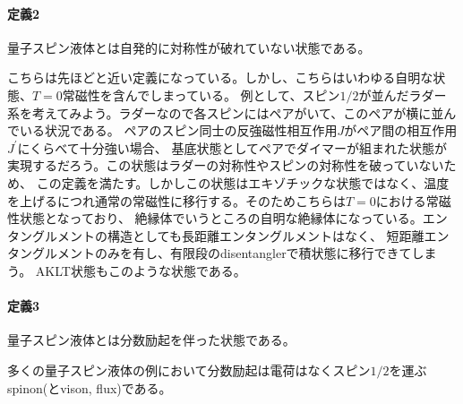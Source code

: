 \documentclass[11pt, aps, longbibliography]{article}
\begin{document}
        \begin{tcolorbox}\hypertarget{def2}{}
            \paragraph{定義2}
            量子スピン液体とは自発的に対称性が破れていない状態である。
        \end{tcolorbox}
        こちらは先ほどと近い定義になっている。しかし、こちらはいわゆる自明な状態、$T=0$常磁性を含んでしまっている。
        例として、スピン$1/2$が並んだラダー系を考えてみよう。ラダーなので各スピンにはペアがいて、このペアが横に並んでいる状況である。
        ペアのスピン同士の反強磁性相互作用$J$がペア間の相互作用$J^\prime$にくらべて十分強い場合、
        基底状態としてペアでダイマーが組まれた状態が実現するだろう。この状態はラダーの対称性やスピンの対称性を破っていないため、
        この定義を満たす。しかしこの状態はエキゾチックな状態ではなく、温度を上げるにつれ通常の常磁性に移行する。そのためこちらは$T=0$における常磁性状態となっており、
        絶縁体でいうところの自明な絶縁体になっている。エンタングルメントの構造としても長距離エンタングルメントはなく、
        短距離エンタングルメントのみを有し、有限段のdisentanglerで積状態に移行できてしまう。
        AKLT状態もこのような状態である。

        \begin{tcolorbox}\hypertarget{def3}{}
            \paragraph{定義3}
            量子スピン液体とは分数励起を伴った状態である。
        \end{tcolorbox}
            多くの量子スピン液体の例において分数励起は電荷はなくスピン$1/2$を運ぶspinon(とvison, flux)である。
\end{document}
